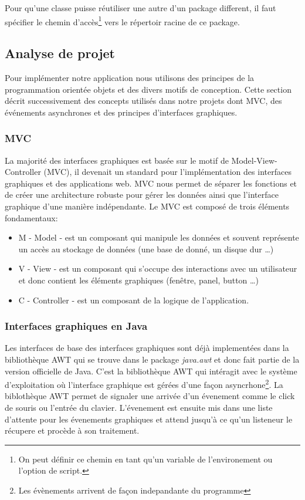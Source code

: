 \documentclass[10pt]{article}
\begin{document}
Pour qu’une classe puisse réutiliser une autre d'un package different, il faut spécifier le chemin d'accès\footnote{On peut définir ce chemin en tant qu'un variable de l'environement ou l'option de script. } vers le répertoir racine de ce package.


\subsection{Analyse de projet}
Pour implémenter notre application nous utilisons des principes de la programmation orientée objets et des divers motifs de conception. Cette section décrit successivement des concepts utilisés dans notre projets dont MVC, des événements asynchrones et des principes d’interfaces graphiques.
 
\subsubsection{MVC}
La majorité des interfaces graphiques est basée sur le motif de Model-View-Controller (MVC), il devenait un standard pour l'implémentation des interfaces graphiques et des applications web. MVC nous permet de séparer les fonctions et de créer une architecture robuste pour gérer les données ainsi que l’interface graphique d’une manière indépendante. Le MVC est composé de trois éléments fondamentaux:
\begin{itemize}
    \item M - Model - est un composant qui manipule les données et souvent représente un accès au stockage de données (une base de donné, un disque dur \ldots)
    \item V - View - est un composant qui s’occupe des interactions avec un utilisateur et donc contient les éléments graphiques (fenêtre, panel, button \ldots)
    \item C - Controller - est un composant de la logique de l’application.
\end{itemize}

\subsubsection{Interfaces graphiques en Java}\label{interface_grap}
Les interfaces de base des interfaces graphiques sont déjà implementées dans la bibliothèque AWT qui se trouve dans le package \textit{java.awt} et donc fait partie de la version officielle de Java. C'est la bibliothèque AWT qui intéragit avec le système d'exploitation où l'interface graphique est gérées d'une façon asyncrhone\footnote{Les évènements arrivent de façon indepandante du programme}. La biblothèque AWT permet de signaler une arrivée d'un évenement comme le click de souris ou l'entrée du clavier. L'évenement est ensuite mis dans une liste d'attente pour les évenements graphiques et attend jusqu'à ce qu'un listeneur le récupere et procède à son traitement.
\newpage
\end{document}
